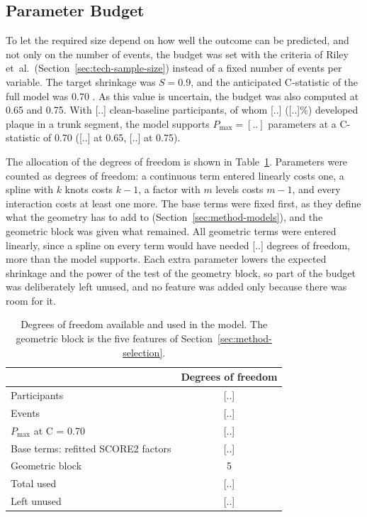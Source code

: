 \subsection{Parameter Budget}
\label{sec:method-size-budget}

To let the required size depend on how well the outcome can be predicted, and not only on the number of events, the budget was set with the criteria of Riley et~al.\ (Section~\ref{sec:tech-sample-size}) instead of a fixed number of events per variable.
The target shrinkage was $S = 0.9$, and the anticipated C-statistic of the full model was 0.70 .
As this value is uncertain, the budget was also computed at 0.65 and 0.75.
With [..] clean-baseline participants, of whom [..] ([..]\%) developed plaque in a trunk segment, the model supports $P_{\max} = [..]$ parameters at a C-statistic of 0.70 ([..] at 0.65, [..] at 0.75).

The allocation of the degrees of freedom is shown in Table~\ref{tab:method-size-budget}.
Parameters were counted as degrees of freedom: a continuous term entered linearly costs one, a spline with $k$ knots costs $k-1$, a factor with $m$ levels costs $m-1$, and every interaction costs at least one more.
The base terms were fixed first, as they define what the geometry has to add to (Section~\ref{sec:method-models}), and the geometric block was given what remained.
All geometric terms were entered linearly, since a spline on every term would have needed [..] degrees of freedom, more than the model supports.
Each extra parameter lowers the expected shrinkage and the power of the test of the geometry block, so part of the budget was deliberately left unused, and no feature was added only because there was room for it.

\begin{table}[htbp]
  \centering
  \caption{Degrees of freedom available and used in the model. The geometric block is the five features of Section~\ref{sec:method-selection}.}
  \label{tab:method-size-budget}
  \small
  \begin{tabular}{>{\raggedright\arraybackslash}p{6.4cm}c}
    \toprule
    & Degrees of freedom \\
    \midrule
    Participants & [..] \\
    Events & [..] \\
    $P_{\max}$ at C = 0.70 & [..] \\
    \midrule
    Base terms: refitted SCORE2 factors & [..] \\
    Geometric block & 5 \\
    \midrule
    Total used & [..] \\
    Left unused & [..] \\
    \bottomrule
  \end{tabular}
\end{table}

